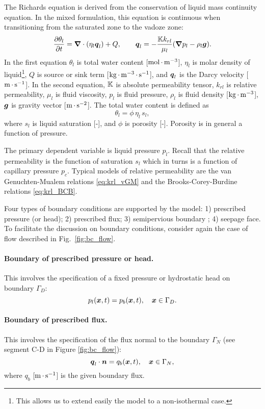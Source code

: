 The Richards equation is derived from the conservation of
liquid mass continuity equation.
In the mixed formulation, this equation is continuous when 
transitioning from the saturated zone to the vadoze zone:
\begin{equation}
  \frac{\partial \theta_l}{\partial t} 
  = {\boldsymbol{\nabla}} \cdot (\eta_l {\boldsymbol{q}}_l) + Q,
  \qquad
  {\boldsymbol{q}}_l = -\frac{{\mathbb K} k_{rl}}{\mu_l} 
  ({\boldsymbol{\nabla}} p_l - \rho_l {\boldsymbol{g}}).
\end{equation}
In the first equation $\theta_l$ is total water content [${\rm mol}{\,\cdot\,}{\rm m}^{-3}$],
$\eta_l$ is molar density of liquid\footnote{This allows us to extend easily the model to a non-isothermal case.},
$Q$ is source or sink term [${\rm kg} {\,\cdot\,} {\rm m}^{-3} {\,\cdot\,} {\rm s}^{-1}$],
and ${\boldsymbol{q}}_l$ is the Darcy velocity [${\rm m} {\,\cdot\,} {\rm s}^{-1}$].
In the second equation,
${\mathbb K}$ is absolute permeability tensor,
$k_{rl}$ is relative permeability,
$\mu_l$ is fluid viscosity,
$p_l$ is fluid pressure,
$\rho_l$ is fluid density [${\rm kg} {\,\cdot\,} {\rm m}^{-3}$],
${\boldsymbol{g}}$ is gravity vector [${\rm m} {\,\cdot\,} {\rm s}^{-2}$].
The total water content is defined as
$$
  \theta_l = \phi\, \eta_l\, s_l,
$$
where $s_l$ is liquid saturation [-], and $\phi$ is porosity [-].
Porosity is in general a function of pressure.

The primary dependent variable is liquid pressure $p_l$.
Recall that the relative permeability is the function of saturation $s_l$
which in turns is a function of capillary pressure $p_c$. 
Typical models of relative permeability are the van Genuchten-Mualem relations \eqref{eq:krl_vGM}
and the Brooks-Corey-Burdine relations \eqref{eq:krl_BCB}.

Four types of boundary conditions are supported by the model:
1) prescribed pressure (or head);
2) prescribed flux;
3) semipervious boundary \citep[for reference see][]{bear-1979};
4) seepage face.
To facilitate the discussion on boundary conditions, consider again the case of 
flow described in Fig.~\ref{fig:bc_flow}. 

\paragraph{Boundary of prescribed pressure or head.}
This involves the specification of a fixed pressure or hydrostatic head on boundary $\Gamma_D$:
\begin{equation}
  p_l({\boldsymbol{x}},t) = p_{b}({\boldsymbol{x}},t), \quad {\boldsymbol{x}} \in \Gamma_D. 
\end{equation}

\paragraph{Boundary of prescribed flux.}
This involves the specification of the flux normal to the boundary $\Gamma_N$
(see segment C-D in Figure \ref{fig:bc_flow}):
\begin{equation}
  {\boldsymbol{q}}_l\cdot \boldsymbol{n} = q_{b}({\boldsymbol{x}},t), \quad {\boldsymbol{x}} \in \Gamma_N,
\end{equation}
where $q_b$ [${\rm m}{\,\cdot\,}{\rm s}^{-1}$] is the given boundary flux.

